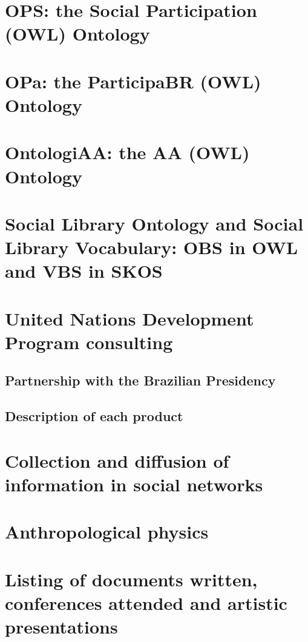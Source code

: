 \begin{apendicesenv}
\section{OPS: the Social Participation (OWL) Ontology}
\section{OPa: the ParticipaBR (OWL) Ontology}
\section{OntologiAA: the AA (OWL) Ontology}
\section{Social Library Ontology and Social Library Vocabulary: OBS in OWL and VBS in SKOS}
\section{United Nations Development Program consulting}
\subsection{Partnership with the Brazilian Presidency}
\subsection{Description of each product}
\section{Collection and diffusion of information in social networks}
\section{Anthropological physics}
\section{Listing of documents written, conferences attended and artistic presentations}

\end{apendicesenv}

